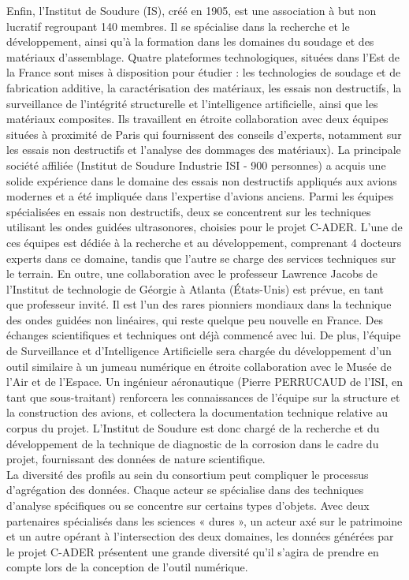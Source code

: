 Enfin, l’Institut de Soudure (IS), créé en 1905, est une association à but non lucratif regroupant 140 membres. Il se spécialise dans la recherche et le développement, ainsi qu’à la formation dans les domaines du soudage et des matériaux d'assemblage. Quatre plateformes technologiques, situées dans l'Est de la France sont mises à disposition pour étudier : les technologies de soudage et de fabrication additive, la caractérisation des matériaux, les essais non destructifs, la surveillance de l'intégrité structurelle et l'intelligence artificielle, ainsi que les matériaux composites. Ils travaillent en étroite collaboration avec deux équipes situées à proximité de Paris qui fournissent des conseils d'experts, notamment sur les essais non destructifs et l’analyse des dommages des matériaux). La principale société affiliée (Institut de Soudure Industrie ISI - 900 personnes) a acquis une solide expérience dans le domaine des essais non destructifs appliqués aux avions modernes et a été impliquée dans l'expertise d'avions anciens. Parmi les équipes spécialisées en essais non destructifs, deux se concentrent sur les techniques utilisant les ondes guidées ultrasonores, choisies pour le projet C-ADER. L'une de ces équipes est dédiée à la recherche et au développement, comprenant 4 docteurs experts dans ce domaine, tandis que l'autre se charge des services techniques sur le terrain. En outre, une collaboration avec le professeur Lawrence Jacobs de l'Institut de technologie de Géorgie à Atlanta (États-Unis) est prévue, en tant que professeur invité. Il est l'un des rares pionniers mondiaux dans la technique des ondes guidées non linéaires, qui reste quelque peu nouvelle en France. Des échanges scientifiques et techniques ont déjà commencé avec lui. De plus, l'équipe de Surveillance et d'Intelligence Artificielle sera chargée du développement d'un outil similaire à un jumeau numérique en étroite collaboration avec le Musée de l’Air et de l’Espace. Un ingénieur aéronautique (Pierre PERRUCAUD de l'ISI, en tant que sous-traitant) renforcera les connaissances de l'équipe sur la structure et la construction des avions, et collectera la documentation technique relative au corpus du projet. L’Institut de Soudure est donc chargé de la recherche et du développement de la technique de diagnostic de la corrosion dans le cadre du projet, fournissant des données de nature scientifique.\\ 

La diversité des profils au sein du consortium peut compliquer le processus d'agrégation des données. Chaque acteur se spécialise dans des techniques d’analyse spécifiques ou se concentre sur certains types d’objets. Avec deux partenaires spécialisés dans les sciences « dures », un acteur axé sur le patrimoine et un autre opérant à l’intersection des deux domaines, les données générées par le projet C-ADER présentent une grande diversité qu’il s’agira de prendre en compte lors de la conception de l’outil numérique. 

